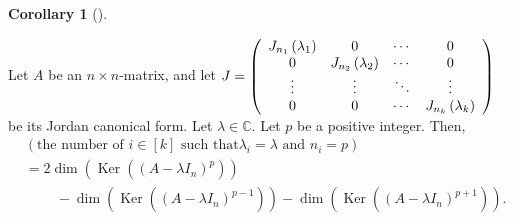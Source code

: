 \documentclass[numbers=enddot,12pt,final,onecolumn,notitlepage]{scrartcl}%
\numberwithin{exer}{subsection}
\theoremstyle{definition}
\newtheorem{coro}[theo]{Corollary}
\newenvironment{corollary}[1][]
{\begin{coro}[#1]\begin{leftbar}}
{\end{leftbar}\end{coro}}
\begin{document}
\begin{corollary}
\label{cor.jnf.unique.cellsizes=}Let $A$ be an $n\times n$-matrix, and let
$J=\left(
\begin{array}
[c]{cccc}%
J_{n_{1}}\left(  \lambda_{1}\right)  & 0 & \cdots & 0\\
0 & J_{n_{2}}\left(  \lambda_{2}\right)  & \cdots & 0\\
\vdots & \vdots & \ddots & \vdots\\
0 & 0 & \cdots & J_{n_{k}}\left(  \lambda_{k}\right)
\end{array}
\right)  $ be its Jordan canonical form. Let $\lambda\in\mathbb{C}$. Let $p$
be a positive integer. Then,%
\begin{align*}
&  \left(  \text{the number of }i\in\left[  k\right]  \text{ such that
}\lambda_{i}=\lambda\text{ and }n_{i}=p\right) \\
&  =2\dim\left(  \operatorname*{Ker}\left(  \left(  A-\lambda I_{n}\right)
^{p}\right)  \right) \\
&  \ \ \ \ \ \ \ \ \ \ -\dim\left(  \operatorname*{Ker}\left(  \left(
A-\lambda I_{n}\right)  ^{p-1}\right)  \right)  -\dim\left(
\operatorname*{Ker}\left(  \left(  A-\lambda I_{n}\right)  ^{p+1}\right)
\right)  .
\end{align*}

\end{corollary}
\end{document}

